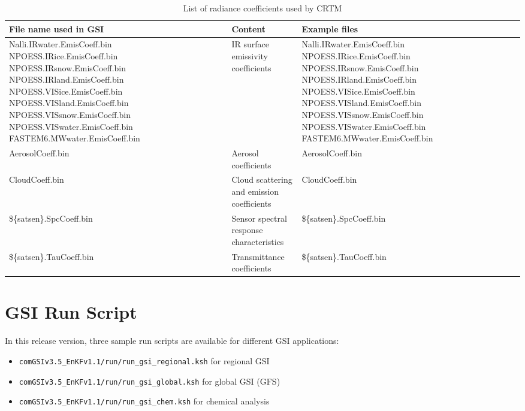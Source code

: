 \begin{table}[htbp]
\centering
\begin{small}
\caption{List of radiance coefficients used by CRTM}
\begin{tabular}{|p{5.5cm}|p{3.5cm}|p{5.5cm}|}
\hline
\hline
File name used in GSI & Content & Example files \\
\hline
\hline
Nalli.IRwater.EmisCoeff.bin
NPOESS.IRice.EmisCoeff.bin
NPOESS.IRsnow.EmisCoeff.bin
NPOESS.IRland.EmisCoeff.bin
NPOESS.VISice.EmisCoeff.bin
NPOESS.VISland.EmisCoeff.bin
NPOESS.VISsnow.EmisCoeff.bin
NPOESS.VISwater.EmisCoeff.bin
FASTEM6.MWwater.EmisCoeff.bin &	
IR surface emissivity coefficients & 
Nalli.IRwater.EmisCoeff.bin
NPOESS.IRice.EmisCoeff.bin
NPOESS.IRsnow.EmisCoeff.bin
NPOESS.IRland.EmisCoeff.bin
NPOESS.VISice.EmisCoeff.bin
NPOESS.VISland.EmisCoeff.bin
NPOESS.VISsnow.EmisCoeff.bin
NPOESS.VISwater.EmisCoeff.bin
FASTEM6.MWwater.EmisCoeff.bin \\
\hline
AerosolCoeff.bin & Aerosol coefficients & AerosolCoeff.bin \\
\hline
CloudCoeff.bin & Cloud scattering and emission coefficients & CloudCoeff.bin \\
\hline
\$\{satsen\}.SpcCoeff.bin & Sensor spectral response characteristics & \$\{satsen\}.SpcCoeff.bin \\
\hline
\$\{satsen\}.TauCoeff.bin & Transmittance coefficients & \$\{satsen\}.TauCoeff.bin \\
\hline
\end{tabular}
\label{t34} 
\end{small}
\end{table}

\section{GSI Run Script}

In this release version, three sample run scripts are available for different GSI applications: 

\begin{itemize}
\item \verb|comGSIv3.5_EnKFv1.1/run/run_gsi_regional.ksh|  for regional GSI
\item \verb|comGSIv3.5_EnKFv1.1/run/run_gsi_global.ksh|  for global GSI (GFS)
\item \verb|comGSIv3.5_EnKFv1.1/run/run_gsi_chem.ksh| for chemical analysis
\end{itemize}

